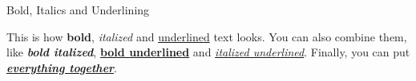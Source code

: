 
\begin{frame}{Bold, Italics and Underlining}

This is how \textbf{bold}, \textit{italized} and
\underline{underlined} text looks.
You can also combine them, like \textbf{\textit{bold
italized}}, \underline{\textbf{bold underlined}} and
\textit{\underline{italized underlined}}.
Finally, you can put
\textbf{\textit{\underline{everything together}}}.

\end{frame}